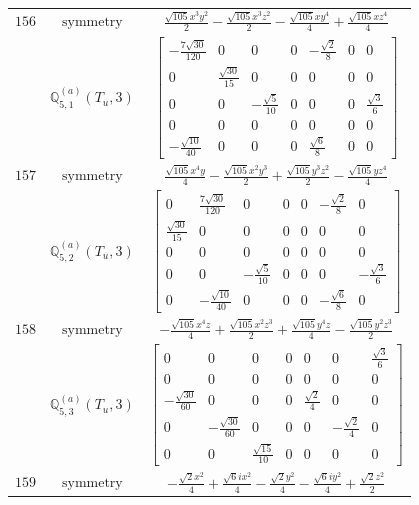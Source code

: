 \documentclass[fleqn,8pt,landscape]{jsarticle}
\begin{document}
\begin{longtable}{ccc}
$ 156 $ & $ \text{symmetry} $ & $ \frac{\sqrt{105} x^{3} y^{2}}{2} - \frac{\sqrt{105} x^{3} z^{2}}{2} - \frac{\sqrt{105} x y^{4}}{4} + \frac{\sqrt{105} x z^{4}}{4} $ \\
$  $ & $ \mathbb{Q}_{5,1}^{(a)}(T_{u},3) $ & $ \begin{bmatrix} - \frac{7 \sqrt{30}}{120} & 0 & 0 & 0 & - \frac{\sqrt{2}}{8} & 0 & 0 \\ 0 & \frac{\sqrt{30}}{15} & 0 & 0 & 0 & 0 & 0 \\ 0 & 0 & - \frac{\sqrt{5}}{10} & 0 & 0 & 0 & \frac{\sqrt{3}}{6} \\ 0 & 0 & 0 & 0 & 0 & 0 & 0 \\ - \frac{\sqrt{10}}{40} & 0 & 0 & 0 & \frac{\sqrt{6}}{8} & 0 & 0 \end{bmatrix} $ \\ \hline
$ 157 $ & $ \text{symmetry} $ & $ \frac{\sqrt{105} x^{4} y}{4} - \frac{\sqrt{105} x^{2} y^{3}}{2} + \frac{\sqrt{105} y^{3} z^{2}}{2} - \frac{\sqrt{105} y z^{4}}{4} $ \\
$  $ & $ \mathbb{Q}_{5,2}^{(a)}(T_{u},3) $ & $ \begin{bmatrix} 0 & \frac{7 \sqrt{30}}{120} & 0 & 0 & 0 & - \frac{\sqrt{2}}{8} & 0 \\ \frac{\sqrt{30}}{15} & 0 & 0 & 0 & 0 & 0 & 0 \\ 0 & 0 & 0 & 0 & 0 & 0 & 0 \\ 0 & 0 & - \frac{\sqrt{5}}{10} & 0 & 0 & 0 & - \frac{\sqrt{3}}{6} \\ 0 & - \frac{\sqrt{10}}{40} & 0 & 0 & 0 & - \frac{\sqrt{6}}{8} & 0 \end{bmatrix} $ \\ \hline
$ 158 $ & $ \text{symmetry} $ & $ - \frac{\sqrt{105} x^{4} z}{4} + \frac{\sqrt{105} x^{2} z^{3}}{2} + \frac{\sqrt{105} y^{4} z}{4} - \frac{\sqrt{105} y^{2} z^{3}}{2} $ \\
$  $ & $ \mathbb{Q}_{5,3}^{(a)}(T_{u},3) $ & $ \begin{bmatrix} 0 & 0 & 0 & 0 & 0 & 0 & \frac{\sqrt{3}}{6} \\ 0 & 0 & 0 & 0 & 0 & 0 & 0 \\ - \frac{\sqrt{30}}{60} & 0 & 0 & 0 & \frac{\sqrt{2}}{4} & 0 & 0 \\ 0 & - \frac{\sqrt{30}}{60} & 0 & 0 & 0 & - \frac{\sqrt{2}}{4} & 0 \\ 0 & 0 & \frac{\sqrt{15}}{10} & 0 & 0 & 0 & 0 \end{bmatrix} $ \\ \hline
$ 159 $ & $ \text{symmetry} $ & $ - \frac{\sqrt{2} x^{2}}{4} + \frac{\sqrt{6} i x^{2}}{4} - \frac{\sqrt{2} y^{2}}{4} - \frac{\sqrt{6} i y^{2}}{4} + \frac{\sqrt{2} z^{2}}{2} $ \\

\end{longtable}
\end{document}
